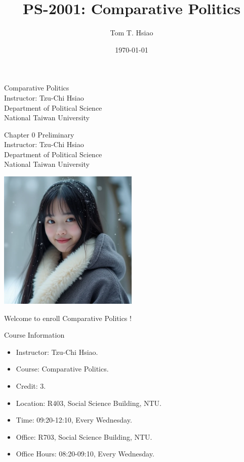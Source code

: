 \documentclass{beamer}
\title{PS-2001: Comparative Politics}
\author{Tom T. Hsiao}
\date{\today}
\begin{document}
\begin{frame}
\begin{center}
\Large{Comparative Politics} \\
\vspace{3em}
\normalsize{Instructor: Tzu-Chi Hsiao} \\
\vspace{3em}
\small{Department of Political Science} \\
\vspace{1em}
\small{National Taiwan University}
\end{center}
\end{frame}
\begin{frame}
\begin{center}
\Large{Chapter 0 Preliminary} \\
\vspace{3em}
\normalsize{Instructor: Tzu-Chi Hsiao} \\
\vspace{3em}
\small{Department of Political Science} \\
\vspace{1em}
\small{National Taiwan University} \\
\end{center}
\end{frame}
\begin{frame}{}
\begin{center}
\includegraphics[width=0.5\textwidth]{instructor.png}
\end{center}
\vspace{1em}
\begin{center}
\Large{Welcome to enroll Comparative Politics !} \\
\end{center}
\end{frame}
\begin{frame}{Course Information}
\begin{itemize}
\item Instructor: Tzu-Chi Hsiao.
\item Course: Comparative Politics.
\item Credit: 3.
\item Location: R403, Social Science Building, NTU.
\item Time: 09:20-12:10, Every Wednesday.
\item Office: R703, Social Science Building, NTU.
\item Office Hours: 08:20-09:10, Every Wednesday.
\end{itemize}
\end{frame}
\end{document}
